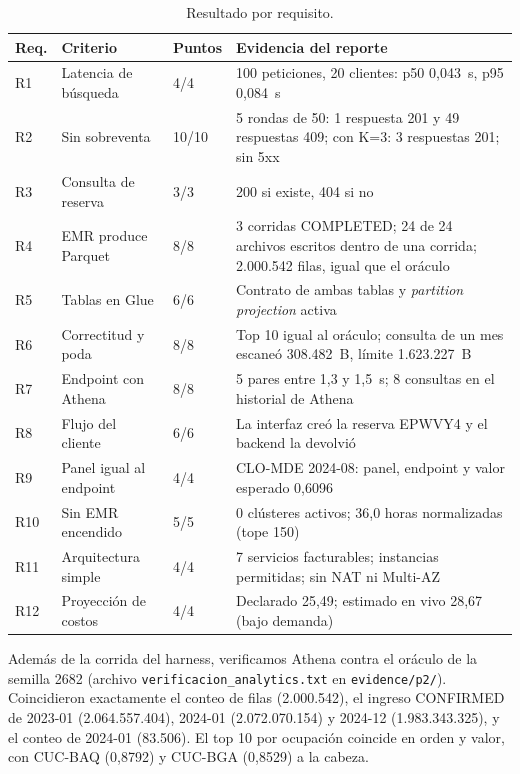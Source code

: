 \documentclass[11pt,letterpaper]{article}
\begin{document}
\begin{table}[H]
\centering
\begin{tabular}{C{0.9cm} L{4.6cm} C{1.3cm} L{7.2cm}}
\toprule
\textbf{Req.} & \textbf{Criterio} & \textbf{Puntos} & \textbf{Evidencia del reporte} \\
\midrule
R1 & Latencia de búsqueda & 4/4 & 100 peticiones, 20 clientes: p50 0,043~s, p95 0,084~s \\
R2 & Sin sobreventa & 10/10 & 5 rondas de 50: 1 respuesta 201 y 49 respuestas 409; con K=3: 3 respuestas 201; sin 5xx \\
R3 & Consulta de reserva & 3/3 & 200 si existe, 404 si no \\
R4 & EMR produce Parquet & 8/8 & 3 corridas COMPLETED; 24 de 24 archivos escritos dentro de una corrida; 2.000.542 filas, igual que el oráculo \\
R5 & Tablas en Glue & 6/6 & Contrato de ambas tablas y \emph{partition projection} activa \\
R6 & Correctitud y poda & 8/8 & Top 10 igual al oráculo; consulta de un mes escaneó 308.482~B, límite 1.623.227~B \\
R7 & Endpoint con Athena & 8/8 & 5 pares entre 1,3 y 1,5~s; 8 consultas en el historial de Athena \\
R8 & Flujo del cliente & 6/6 & La interfaz creó la reserva EPWVY4 y el backend la devolvió \\
R9 & Panel igual al endpoint & 4/4 & CLO-MDE 2024-08: panel, endpoint y valor esperado 0,6096 \\
R10 & Sin EMR encendido & 5/5 & 0 clústeres activos; 36,0 horas normalizadas (tope 150) \\
R11 & Arquitectura simple & 4/4 & 7 servicios facturables; instancias permitidas; sin NAT ni Multi-AZ \\
R12 & Proyección de costos & 4/4 & Declarado 25,49; estimado en vivo 28,67 (bajo demanda) \\
\bottomrule
\end{tabular}
\caption{Resultado por requisito.}
\end{table}

Además de la corrida del harness, verificamos Athena contra el oráculo de la semilla 2682 (archivo \texttt{verificacion\_analytics.txt} en \texttt{evidence/p2/}). Coincidieron exactamente el conteo de filas (2.000.542), el ingreso CONFIRMED de 2023-01 (2.064.557.404), 2024-01 (2.072.070.154) y 2024-12 (1.983.343.325), y el conteo de 2024-01 (83.506). El top 10 por ocupación coincide en orden y valor, con CUC-BAQ (0,8792) y CUC-BGA (0,8529) a la cabeza.
\end{document}
